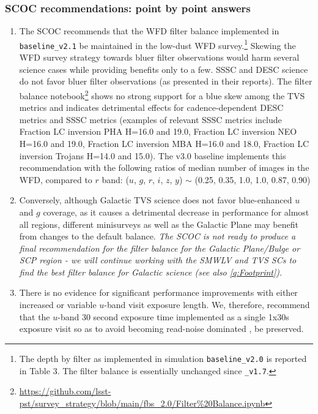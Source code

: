 \subsubsection{SCOC recommendations: point by point answers }\label{rec:filterdist}

\begin{enumerate}

\item The SCOC recommends that the WFD filter balance implemented in \texttt{baseline\_v2.1}  be maintained in the low-dust WFD survey.\footnote{The depth by filter as implemented in simulation \texttt{baseline\_v2.0} is reported in \citep{PSTN-054} Table 3. The filter balance is essentially unchanged since \texttt{\baseline\_v1.7}.} Skewing the WFD survey strategy towards bluer filter observations would harm several science cases while providing benefits only to a few. 
SSSC and DESC science do not favor bluer filter observations (as presented in their reports).
The filter balance notebook\footnote{
\url{https://github.com/lsst-pst/survey_strategy/blob/main/fbs_2.0/Filter\%20Balance.ipynb}
} shows no strong support for a blue skew among the TVS metrics and indicates detrimental effects for cadence-dependent DESC metrics and SSSC metrics (examples of relevant SSSC metrics include Fraction LC inversion PHA H=16.0 and 19.0, Fraction LC inversion NEO H=16.0 and 19.0, Fraction LC inversion MBA H=16.0 and 18.0, Fraction LC inversion Trojans H=14.0 and 15.0). The v3.0 baseline implements this recommendation with the following ratios of median number of images in the WFD, compared to $r$ band: ($u$, $g$, $r$, $i$, $z$, $y$) $\sim$ (0.25, 0.35, 1.0, 1.0, 0.87, 0.90)


\item Conversely, although Galactic TVS science does not favor blue-enhanced $u$ and $g$ coverage, as it causes a detrimental decrease in performance for almost all regions,  different minisurveys as well as the Galactic Plane may benefit from changes to the default balance. \emph{The SCOC is not ready to produce a final recommendation for the filter balance for the Galactic Plane/Bulge or SCP region - we will continue working with the SMWLV and TVS SCs to find the best filter balance for Galactic science (see also \autoref{q:Footprint}).}

\item There is no evidence for significant performance improvements with either increased or variable $u$-band visit exposure length. We, therefore, recommend that the $u$-band 30 second exposure time implemented as a single 1x30s exposure visit so as to avoid becoming read-noise dominated \citep{PSTN-053},  be preserved.


\end{enumerate}
